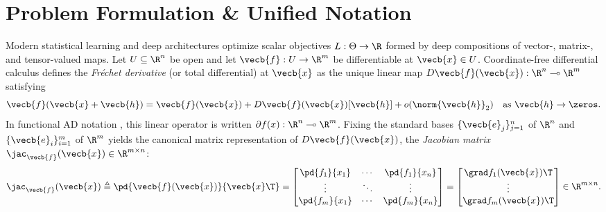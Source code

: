 \documentclass[../../../../master.tex]{subfiles}
\begin{document}

\section{Problem Formulation \& Unified Notation}
\label{sec:matcalc:formulation}

Modern statistical learning and deep architectures optimize scalar objectives
$L : \Theta \to \R$ formed by deep compositions of vector-, matrix-, and
tensor-valued maps. Let $U \subseteq \R^n$ be open and let
$\vecb{f} : U \to \R^m$ be differentiable at $\vecb{x} \in U$. Coordinate-free
differential calculus defines the \emph{Fr\'{e}chet derivative} (or total
differential) at $\vecb{x}$ as the unique linear map
$D\vecb{f}(\vecb{x}) : \R^n \multimap \R^m$ satisfying
\begin{equation}
  \vecb{f}(\vecb{x} + \vecb{h})
  = \vecb{f}(\vecb{x}) + D\vecb{f}(\vecb{x})[\vecb{h}] + o(\norm{\vecb{h}}_2)
  \quad \text{as } \vecb{h} \to \zeros.
  \label{eq:matcalc:frechet}
\end{equation}
In functional AD notation
,
this linear operator is written $\partial f(x) : \R^n \multimap \R^m$.
Fixing the standard bases $\{\vecb{e}_j\}_{j=1}^n$ of $\R^n$ and
$\{\vecb{e}_i\}_{i=1}^m$ of $\R^m$ yields the canonical matrix representation of
$D\vecb{f}(\vecb{x})$, the \emph{Jacobian matrix}
$\jac_{\vecb{f}}(\vecb{x}) \in \R^{m \times n}$:
\begin{equation}
  \jac_{\vecb{f}}(\vecb{x})
  \triangleq \pd{\vecb{f}(\vecb{x})}{\vecb{x}\T}
  = \begin{bmatrix}
      \pd{f_1}{x_1} & \cdots & \pd{f_1}{x_n} \\
      \vdots & \ddots & \vdots \\
      \pd{f_m}{x_1} & \cdots & \pd{f_m}{x_n}
    \end{bmatrix}
  = \begin{bmatrix}
      \grad f_1(\vecb{x})\T \\
      \vdots \\
      \grad f_m(\vecb{x})\T
    \end{bmatrix}
  \in \R^{m \times n}.
  \label{eq:matcalc:jacobian_def}
\end{equation}
\end{document}
